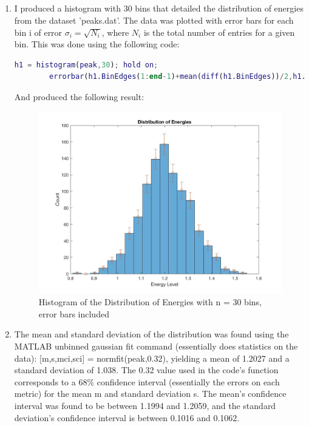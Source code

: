 \documentclass{article}
\begin{document}
    \subsection{}
    \begin{enumerate}
        \item I produced a histogram with 30 bins that detailed the distribution of energies from the dataset 'peaks.dat'. The data was plotted with error bars for each bin i of error $\sigma_i = \sqrt{N_i}$, where $N_i$ is the total number of entries for a given bin. This was done using the following code:
        \begin{lstlisting}[language=Matlab, caption=Matlab code]
        h1 = histogram(peak,30); hold on;
        errorbar(h1.BinEdges(1:end-1)+mean(diff(h1.BinEdges))/2,h1.BinCounts,sqrt(h1.Values),'o'); hold off;
        \end{lstlisting}
        And produced the following result:
        \begin{figure}[H]
    \centering
    \includegraphics[scale = 0.3]{5a.jpg}
    \caption{Histogram of the Distribution of Energies with n = 30 bins, error bars included}
    \label{fig:my_label}
\end{figure}
        \item The mean and standard deviation of the distribution was found using the MATLAB unbinned gaussian fit command (essentially does statistics on the data): [m,s,mci,sci] = normfit(peak,0.32), yielding a mean of 1.2027 and a standard deviation of 1.038. The 0.32 value used in the code's function corresponds to a 68$\%$ confidence interval (essentially the errors on each metric) for the mean m and standard deviation s. The mean's confidence interval was found to be between 1.1994 and 1.2059, and the standard deviation's confidence interval is between 0.1016 and 0.1062.

\end{enumerate}
\end{document}
